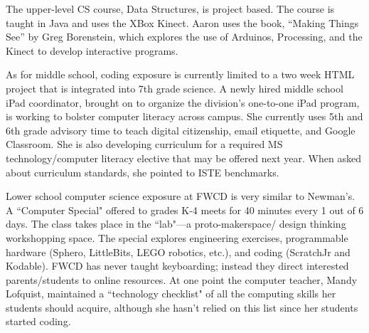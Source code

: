 The upper-level CS course, Data Structures, is project based. The course is taught in Java and uses the XBox Kinect. Aaron uses the book, “Making Things See” by Greg Borenstein, which explores the use of Arduinos, Processing, and the Kinect to develop interactive programs. \par
As for middle school, coding exposure is currently limited to a two week HTML project that is integrated into 7th grade science. A newly hired middle school iPad coordinator, brought on to organize the division's one-to-one iPad program, is working to bolster computer literacy across campus. She currently uses 5th and 6th grade advisory time to teach digital citizenship, email etiquette, and Google Classroom. She is also developing curriculum for a required MS technology/computer literacy elective that may be offered next year. When asked about curriculum standards, she pointed to ISTE benchmarks. \par
Lower school computer science exposure at FWCD is very similar to Newman's. A ``Computer Special" offered to grades K-4 meets for 40 minutes every 1 out of 6 days. The class takes place in the ``lab"---a proto-makerspace/ design thinking workshopping space. The special explores engineering exercises, programmable hardware (Sphero, LittleBits, LEGO robotics, etc.), and coding (ScratchJr and Kodable). FWCD has never taught keyboarding; instead they direct interested parents/students to online resources. At one point the computer teacher, Mandy Lofquist, maintained a ``technology checklist" of all the computing skills her students should acquire, although she hasn't relied on this list since her students started coding. \par


